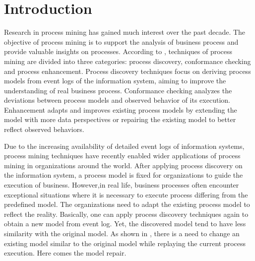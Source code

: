 \documentclass[]{article}
\begin{document}
\section{Introduction}
Research in process mining has gained much interest over the past decade\cite{van2011process,ghasemi2016process}. The objective of process mining is to support the analysis of business process and provide valuable insights on processes. According to \cite{van2011process}, techniques of process mining are divided into three categories: process discovery, conformance checking and process enhancement. Process discovery techniques focus on deriving process models from event logs of the information system, aiming to improve the understanding of real business process. Conformance checking analyzes the deviations between process models and observed behavior of its execution. Enhancement adapts and improves existing process models by extending the model with more data perspectives or repairing the existing model to better reflect observed behaviors. 

Due to the increasing availability of detailed event logs of information systems, process mining techniques have recently enabled wider applications of process mining in organizations around the world\cite{van2011process}. After applying process discovery  on the information system, a process model is fixed for organizations to guide the execution of business. However,in real life, business processes often encounter exceptional situations where it is necessary to execute process differing from the predefined model. The organizations need to adapt the existing process model to reflect the reality. Basically, one can apply process discovery techniques again to obtain a new model from event log. Yet, the discovered model tend to have less similarity with the original model\cite{fahland2012repairing}. As shown in \cite{fahland2012repairing}, there is a need to change an existing model similar to the original model while replaying the current process execution. Here comes the model repair. 
\end{document}
